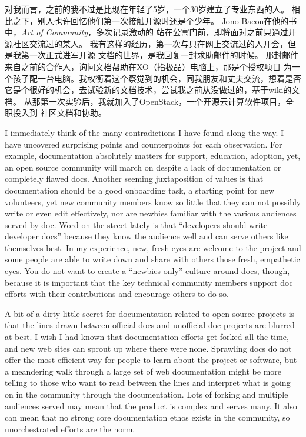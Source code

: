 对我而言，之前的我不过是比现在年轻了5岁，一个30岁建立了专业东西的人。
相比之下，别人也许回忆他们第一次接触开源时还是个少年。
Jono Bacon在他的书中，\textit{Art of Community}，多次记录激动的
站在公寓门前，即将面对之前只通过开源社区交流过的某人。
我有这样的经历，第一次与只在网上交流过的人开会，但是我第一次正式进军开源
文档的世界，是我回复一封求助邮件的时候。
那封邮件来自之前的合作人，询问文档帮助在XO（指极品）电脑上，那是个授权项目
为一个孩子配一台电脑。我权衡着这个察觉到的机会，同我朋友和丈夫交流，想着是否
它是个很好的机会，去试验新的文档技术，尝试我之前从没做过的，基于wiki的文档。
从那第一次实验后，我就加入了OpenStack，一个开源云计算软件项目，全职投入到
社区文档和协助。

I immediately think of the many contradictions I have found along the way. I
have uncovered surprising points and counterpoints for each observation. For
example, documentation absolutely matters for support, education, adoption, yet,
an open source community will march on despite a lack of documentation or
completely flawed docs. Another seeming juxtaposition of values is that
documentation should be a good onboarding task, a starting point for new
volunteers, yet new community members know so little that they can not possibly
write or even edit effectively, nor are newbies familiar with the various
audiences served by doc. Word on the street lately is that ``developers should
write developer docs'' because they know the audience well and can serve others
like themselves best. In my experience, new, fresh eyes are welcome to the
project and some people are able to write down and share with others those
fresh, empathetic eyes. You do not want to create a ``newbies-only'' culture
around docs, though, because it is important that the key technical community
members support doc efforts with their contributions and encourage others to do
so. 

A bit of a dirty little secret for documentation related to open source projects
is that the lines drawn between official docs and unofficial doc projects are
blurred at best. I wish I had known that documentation efforts get forked all
the time, and new web sites can sprout up where there were none. Sprawling docs
do not offer the most efficient way for people to learn about the project or
software, but a meandering walk through a large set of web documentation might
be more telling to those who want to read between the lines and interpret what
is going on in the community through the documentation. Lots of forking and
multiple audiences served may mean that the product is complex and serves many.
It also can mean that no strong core documentation ethos exists in the
community, so unorchestrated efforts are the norm. 


